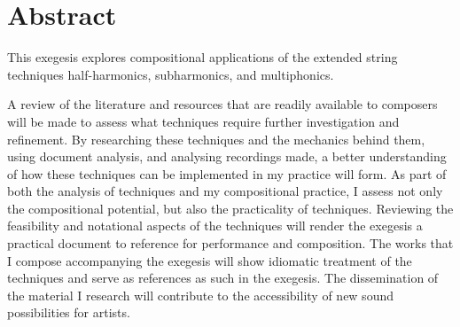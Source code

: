 \chapter*{Abstract}
 

This exegesis explores compositional applications of the extended string techniques half-harmonics, subharmonics, and multiphonics.

A review of the literature and resources that are readily available to composers will be made to assess what techniques require further investigation and refinement. 
By researching these techniques and the mechanics behind them, using document analysis, and analysing recordings made, a better understanding of how these techniques can be implemented in my practice will form. 
As part of both the analysis of techniques and my compositional practice, I assess not only the compositional potential, but also the practicality of techniques. 
Reviewing the feasibility and notational aspects of the techniques will render the exegesis a practical document to reference for performance and composition. 
The works that I compose accompanying the exegesis will show idiomatic treatment of the techniques and serve as references as such in the exegesis. 
The dissemination of the material I research will contribute to the accessibility of new sound possibilities for artists. 